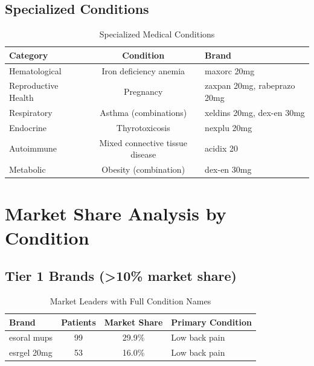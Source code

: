 \documentclass[10pt]{article}
\begin{document}
\subsection{Specialized Conditions}
\begin{table}[h!]
\centering
\caption{Specialized Medical Conditions}
\begin{tabular}{l|c|l}
\toprule
\rowcolor{headercolor}
\textbf{Category} & \textbf{Condition} & \textbf{Brand} \\
\midrule
Hematological & Iron deficiency anemia & maxorc 20mg \\
\rowcolor{altrowcolor}
Reproductive Health & Pregnancy & zaxpan 20mg, rabeprazo 20mg \\
Respiratory & Asthma (combinations) & xeldins 20mg, dex-en 30mg \\
\rowcolor{altrowcolor}
Endocrine & Thyrotoxicosis & nexplu 20mg \\
Autoimmune & Mixed connective tissue disease & acidix 20 \\
\rowcolor{altrowcolor}
Metabolic & Obesity (combination) & dex-en 30mg \\
\bottomrule
\end{tabular}
\end{table}

\section{Market Share Analysis by Condition}

\subsection{Tier 1 Brands (>10\% market share)}
\begin{table}[h!]
\centering
\caption{Market Leaders with Full Condition Names}
\begin{tabular}{l|c|c|l}
\toprule
\rowcolor{headercolor}
\textbf{Brand} & \textbf{Patients} & \textbf{Market Share} & \textbf{Primary Condition} \\
\midrule
esoral mups & 99 & 29.9\% & Low back pain \\
\rowcolor{altrowcolor}
esrgel 20mg & 53 & 16.0\% & Low back pain \\
\bottomrule
\end{tabular}
\end{table}
\end{document}
